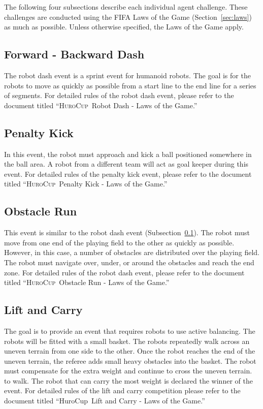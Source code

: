 \documentclass[12pt]{article}
\newcommand{\HuroCup}{\textsc{HuroCup}}
\newcounter{law}[section]
\begin{document}
The following four subsections describe each individual agent
challenge. These challenges are conducted using the FIFA Laws of the
Game (Section~\ref{sec:laws}) as much as possible. Unless otherwise
specified, the Laws of the Game apply.

\subsection{Forward - Backward Dash}
\label{subsec:robot-dash}

The robot dash event is a sprint event for humanoid robots. The
goal is for the robots to move as quickly as possible from a start
line to the end line for a series of segments. For detailed rules of
the robot dash event, please refer to the document titled
``\HuroCup\ Robot Dash - Laws of the Game.''

\subsection{Penalty Kick}
\label{subsec:penalty-kick}

In this event, the robot must approach and kick a ball positioned
somewhere in the ball area. A robot from a different team will act as
goal keeper during this event. For detailed rules of the penalty kick
event, please refer to the document titled ``\HuroCup\ Penalty
Kick - Laws of the Game.''

\subsection{Obstacle Run}
\label{subsec:obstacle-run} 

This event is similar to the robot dash event
(Subsection~\ref{subsec:robot-dash}). The robot must move from one end
of the playing field to the other as quickly as possible. However, in
this case, a number of obstacles are distributed over the playing
field. The robot must navigate over, under, or around the obstacles
and reach the end zone. For detailed rules of the robot dash
event, please refer to the document titled ``\HuroCup\ Obstacle
Run - Laws of the Game.''

\subsection{Lift and Carry}
\label{subsec:lift-and-carry}

The goal is to provide an event that requires robots to use active
balancing. The robots will be fitted with a small basket. The robots
repeatedly walk across an uneven terrain from one side to the
other. Once the robot reaches the end of the uneven terrain, the
referee adds small heavy obstacles into the basket. The robot must
compensate for the extra weight and continue to cross the uneven
terrain.  to walk. The robot that can carry the most weight is
declared the winner of the event. For detailed rules of the lift and
carry competition please refer to the document titled ``HuroCup\ Lift
and Carry - Laws of the Game.''
\end{document}
